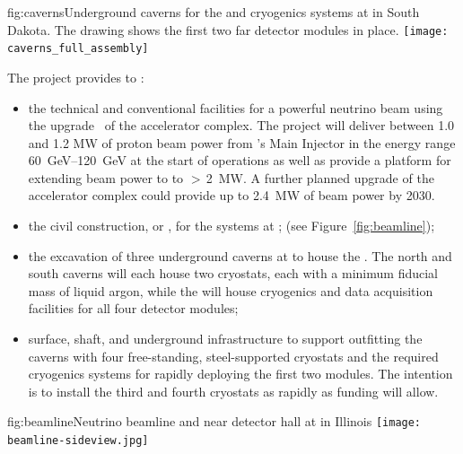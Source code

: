 \begin{dunefigure}{fig:caverns}{Underground caverns for the   and cryogenics systems at  in South Dakota. The drawing shows the first two far detector modules in place.}
\texttt{[image: caverns\_full\_assembly]}
\end{dunefigure}


The  project provides to :
\begin{itemize}
\item  the  technical and conventional facilities for a powerful neutrino beam using the  upgrade~\cite{pip2-2013} of the  accelerator 
complex. The  project will deliver between 1.0 and 1.2 MW of proton beam power from 's Main Injector in the energy range  \SIrange{60}{120}{GeV} at the start of  operations as well as provide a platform for extending beam power to  to %
$>\,$\SI{2}{MW}. %
A further planned upgrade 
of the accelerator complex could provide up to \SI{2.4}{\MW} of beam power by 2030. 

\item  the civil construction, or , for the  systems at ; (see Figure~\ref{fig:beamline});

\item the excavation of three underground caverns at  to house the  . The north and south caverns will each house two cryostats, each with a
 minimum \nominalmodsize fiducial mass of liquid argon, while the  will house cryogenics and data acquisition facilities for all four detector modules;

\item surface, shaft, and underground infrastructure to support 
outfitting the caverns with four free-standing, steel-supported cryostats 
and the required cryogenics systems for rapidly deploying the first two \nominalmodsize {} modules. 
The intention is to install the third and fourth cryostats as rapidly as funding will 
allow.

\end{itemize}


\begin{dunefigure}{fig:beamline}{Neutrino beamline and  near detector hall at  in Illinois}
\texttt{[image: beamline-sideview.jpg]}
\end{dunefigure}



